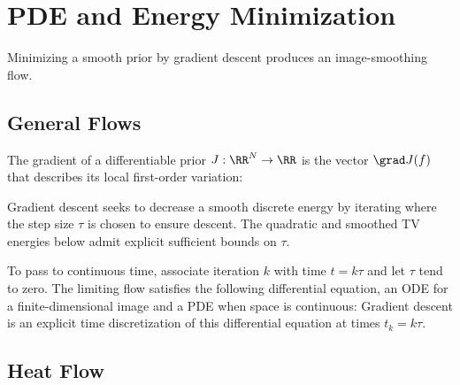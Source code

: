 \section{PDE and Energy Minimization}

Minimizing a smooth prior by gradient descent produces an image-smoothing flow.

                                                                      
\subsection{General Flows}

The gradient of a differentiable prior $J : \RR^N \rightarrow \RR$ is the vector $\grad J(f)$ that describes its local first-order variation:

Gradient descent seeks to decrease a smooth discrete energy by iterating
where the step size $\tau$ is chosen to ensure descent. The quadratic and smoothed TV energies below admit explicit sufficient bounds on $\tau$.

To pass to continuous time, associate iteration $k$ with time $t=k\tau$ and let $\tau$ tend to zero. The limiting flow
satisfies the following differential equation, an ODE for a finite-dimensional image and a PDE when space is continuous:
Gradient descent is an explicit time discretization of this differential equation at times $t_k = k  \tau$.


                                                                      
\subsection{Heat Flow}

